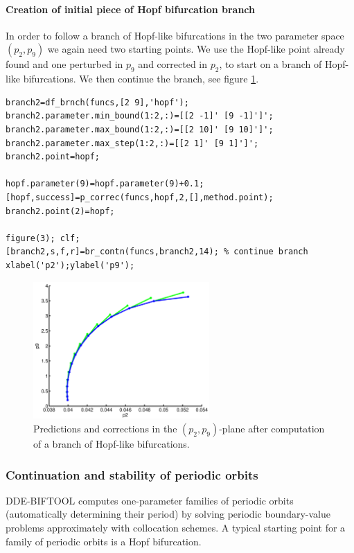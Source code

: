 \documentclass[10pt]{scrartcl}
\newcommand{\DDEBIFCODE}{\textsc{DDE-BIFTOOL}}
\begin{document}
  \paragraph{Creation of initial piece of Hopf bifurcation branch}
In order to follow a branch of Hopf-like bifurcations in the two parameter
space $(p_2,p_9)$ we again need two starting points.
We use the Hopf-like point already found and one perturbed in $p_9$
and corrected in $p_2$, to start on a branch
of Hopf-like bifurcations. We then continue the branch, see figure \ref{br_hopf}.
\begin{lstlisting}
branch2=df_brnch(funcs,[2 9],'hopf');
branch2.parameter.min_bound(1:2,:)=[[2 -1]' [9 -1]']';
branch2.parameter.max_bound(1:2,:)=[[2 10]' [9 10]']';
branch2.parameter.max_step(1:2,:)=[[2 1]' [9 1]']';   
branch2.point=hopf;                                   

hopf.parameter(9)=hopf.parameter(9)+0.1;              
[hopf,success]=p_correc(funcs,hopf,2,[],method.point);
branch2.point(2)=hopf;                                

figure(3); clf;
[branch2,s,f,r]=br_contn(funcs,branch2,14); % continue branch
xlabel('p2');ylabel('p9');  
\end{lstlisting}
\begin{figure}[h]
\begin{center}
\includegraphics[width=0.6\textwidth]{fig/sdd3}
\end{center}
\caption{\small\label{br_hopf} Predictions and corrections
in the $(p_2,p_9)$-plane after computation of a branch of Hopf-like 
bifurcations.}
\end{figure}

\subsubsection{Continuation and stability of periodic orbits}
\label{sec:sd:psol}
\DDEBIFCODE{} computes one-parameter families of periodic orbits
(automatically determining their period) by solving periodic
boundary-value problems approximately with collocation schemes. A
typical starting point for a family of periodic orbits is a Hopf
bifurcation.
\end{document}
